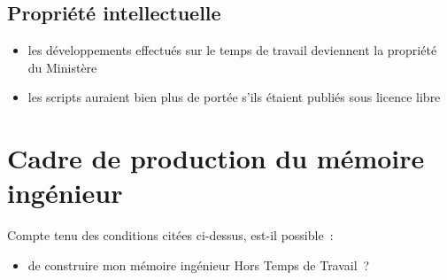 \documentclass[10pt]{article}
\newenvironment{itmz}{\begin{itemize}
\setlength{\itemsep}{0em}
}{\end{itemize}}
\begin{document}
\subsection{Propriété intellectuelle}

\begin{itmz}
\item{les développements effectués sur le temps de travail deviennent la propriété du Ministère}
\item{les scripts auraient bien plus de portée s’ils étaient publiés sous licence libre}
\end{itmz}

\section{Cadre de production du mémoire ingénieur}

Compte tenu des conditions citées ci-dessus, est-il possible :
\begin{itmz}
\item{de construire mon mémoire ingénieur Hors Temps de Travail ?}
\end{itmz}
\end{document}
